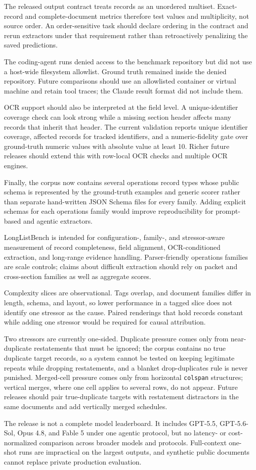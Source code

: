 The released output contract treats records as an unordered multiset. Exact-record and complete-document metrics therefore test values and multiplicity, not source order. An order-sensitive task should declare ordering in the contract and rerun extractors under that requirement rather than retroactively penalizing the saved predictions.

The coding-agent runs denied access to the benchmark repository but did not use a host-wide filesystem allowlist. Ground truth remained inside the denied repository. Future comparisons should use an allowlisted container or virtual machine and retain tool traces; the Claude result format did not include them.

OCR support should also be interpreted at the field level. A unique-identifier coverage check can look strong while a missing section header affects many records that inherit that header. The current validation reports unique identifier coverage, affected records for tracked identifiers, and a numeric-fidelity gate over ground-truth numeric values with absolute value at least 10. Richer future releases should extend this with row-local OCR checks and multiple OCR engines.

Finally, the corpus now contains several operations record types whose public schema is represented by the ground-truth examples and generic scorer rather than separate hand-written JSON Schema files for every family. Adding explicit schemas for each operations family would improve reproducibility for prompt-based and agentic extractors.

LongListBench is intended for configuration-, family-, and stressor-aware measurement of record completeness, field alignment, OCR-conditioned extraction, and long-range evidence handling. Parser-friendly operations families are scale controls; claims about difficult extraction should rely on packet and cross-section families as well as aggregate scores.

Complexity slices are observational. Tags overlap, and document families differ in length, schema, and layout, so lower performance in a tagged slice does not identify one stressor as the cause. Paired renderings that hold records constant while adding one stressor would be required for causal attribution.

Two stressors are currently one-sided. Duplicate pressure comes only from near-duplicate restatements that must be ignored; the corpus contains no true duplicate target records, so a system cannot be tested on keeping legitimate repeats while dropping restatements, and a blanket drop-duplicates rule is never punished. Merged-cell pressure comes only from horizontal \texttt{colspan} structures; vertical merges, where one cell applies to several rows, do not appear. Future releases should pair true-duplicate targets with restatement distractors in the same documents and add vertically merged schedules.

The release is not a complete model leaderboard. It includes GPT-5.5, GPT-5.6-Sol, Opus 4.8, and Fable 5 under one agentic protocol, but no latency- or cost-normalized comparison across broader models and protocols. Full-context one-shot runs are impractical on the largest outputs, and synthetic public documents cannot replace private production evaluation.
